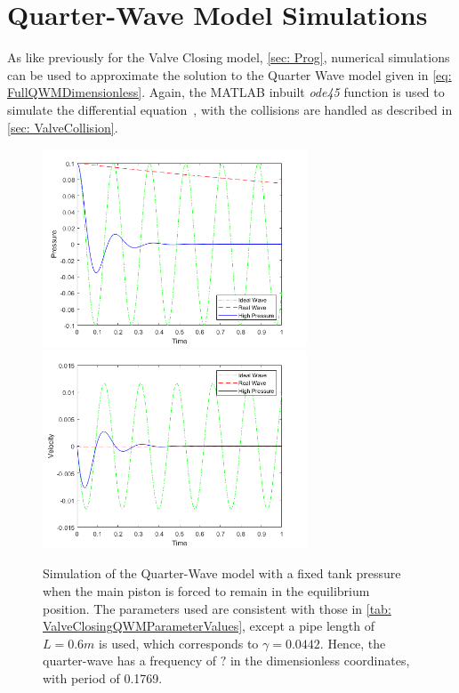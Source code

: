 \chapter{Quarter-Wave Model Simulations}

As like previously for the Valve Closing model, \cref{sec: Prog}, numerical simulations can be used to approximate the solution to the Quarter Wave model given in \cref{eq: FullQWMDimensionless}. Again, the MATLAB inbuilt \textit{ode45} function is used to simulate the differential equation~\cite{Shampine1997TheSuite}, with the collisions are handled as described in \cref{sec: ValveCollision}.
~
\begin{figure}[!ht]
    \centering
    \includegraphics[width=0.7\textwidth]{Figures/QWMSimulation/QWMBehaviourB.png}
    \includegraphics[width=0.7\textwidth]{Figures/QWMSimulation/QWMBehaviourC.png}
    \caption{Simulation of the Quarter-Wave model with a fixed tank pressure when the main piston is forced to remain in the equilibrium position. The parameters used are consistent with those in \cref{tab: ValveClosingQWMParameterValues}, except a pipe length of $L = 0.6 \si{m}$ is used, which corresponds to $\gamma = 0.0442$. Hence, the quarter-wave has a frequency of $?$ in the dimensionless coordinates, with period of 0.1769.}
    \label{fig: QWMBehaviour}
\end{figure}

